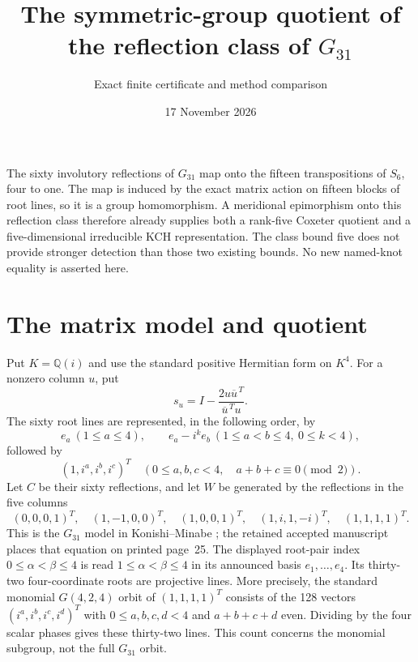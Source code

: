 \documentclass[11pt]{article}
\title{The symmetric-group quotient of the reflection class of $G_{31}$}
\author{Exact finite certificate and method comparison}
\date{17 November 2026}
\newcommand{\Q}{\mathbb Q}
\begin{document}
\maketitle
The sixty involutory reflections of $G_{31}$ map onto the fifteen
transpositions of $S_6$, four to one. The map is induced by the exact
matrix action on fifteen blocks of root lines, so it is a group
homomorphism. A meridional epimorphism onto this reflection class
therefore already supplies both a rank-five Coxeter quotient and a
five-dimensional irreducible KCH representation. The class bound five
does not provide stronger detection than those two existing bounds.
No new named-knot equality is asserted here.

\section*{The matrix model and quotient}
Put $K=\Q(i)$ and use the standard positive Hermitian form on $K^4$.
For a nonzero column $u$, put
\[
 s_u=I-\frac{2u\overline u^{\,T}}{\overline u^{\,T}u}.
\]
The sixty root lines are represented, in the following order, by
\[
 e_a\ (1\le a\le4),\qquad
 e_a-i^k e_b\ (1\le a<b\le4,\ 0\le k<4),
\]
followed by
\[
 (1,i^a,i^b,i^c)^T
 \quad(0\le a,b,c<4,\quad a+b+c\equiv0\pmod2).
\]
Let $C$ be their sixty reflections, and let $W$ be generated by the
reflections in the five columns
\begin{equation}\label{eq:generators}
 (0,0,0,1)^T,\quad(1,-1,0,0)^T,\quad(1,0,0,1)^T,\quad
 (1,i,1,-i)^T,\quad(1,1,1,1)^T .
\end{equation}
This is the $G_{31}$ model in Konishi--Minabe
\cite[Section~6.1, equation~(6.1)]{km25}; the retained accepted manuscript
places that equation on printed page~25. The displayed root-pair index
$0\le\alpha<\beta\le4$ is read $1\le\alpha<\beta\le4$ in its announced
basis $e_1,\ldots,e_4$. Its thirty-two four-coordinate roots are
projective lines. More precisely, the standard monomial
$G(4,2,4)$ orbit of $(1,1,1,1)^T$ consists of the 128 vectors
$(i^a,i^b,i^c,i^d)^T$ with $0\le a,b,c,d<4$ and $a+b+c+d$ even.
Dividing by the four scalar phases gives these thirty-two lines.
This count concerns the monomial subgroup, not the full $G_{31}$ orbit.
\end{document}
